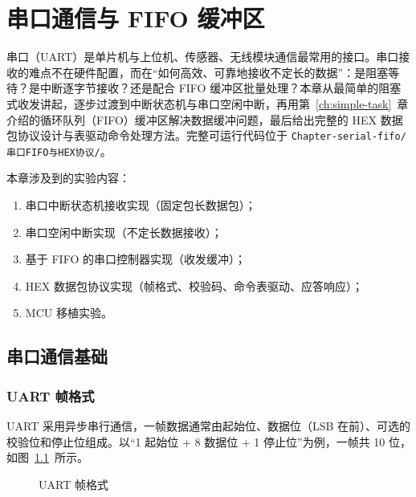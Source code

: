 \chapter{串口通信与 FIFO 缓冲区} \label{ch:serial-fifo}

串口（UART）是单片机与上位机、传感器、无线模块通信最常用的接口。串口接收的难点不在硬件配置，而在“如何高效、可靠地接收不定长的数据”：是阻塞等待？是中断逐字节接收？还是配合 FIFO 缓冲区批量处理？本章从最简单的阻塞式收发讲起，逐步过渡到中断状态机与串口空闲中断，再用第~\ref{ch:simple-task}~章介绍的循环队列（FIFO）缓冲区解决数据缓冲问题，最后给出完整的 HEX 数据包协议设计与表驱动命令处理方法。完整可运行代码位于 \texttt{Chapter-serial-fifo/串口FIFO与HEX协议/}。

\medskip 本章涉及到的实验内容：
\begin{enumerate}
\item 串口中断状态机接收实现（固定包长数据包）；
\item 串口空闲中断实现（不定长数据接收）；
\item 基于 FIFO 的串口控制器实现（收发缓冲）；
\item HEX 数据包协议实现（帧格式、校验码、命令表驱动、应答响应）；
\item MCU 移植实验。
\end{enumerate}

\section{串口通信基础}

\subsection{UART 帧格式}

UART 采用异步串行通信，一帧数据通常由起始位、数据位（LSB 在前）、可选的校验位和停止位组成。以“1 起始位 + 8 数据位 + 1 停止位”为例，一帧共 10 位，如图~\ref{fig:uart-frame}~所示。

\begin{figure}[htbp]
\centering
\caption{UART 帧格式} \label{fig:uart-frame}
\end{figure}

